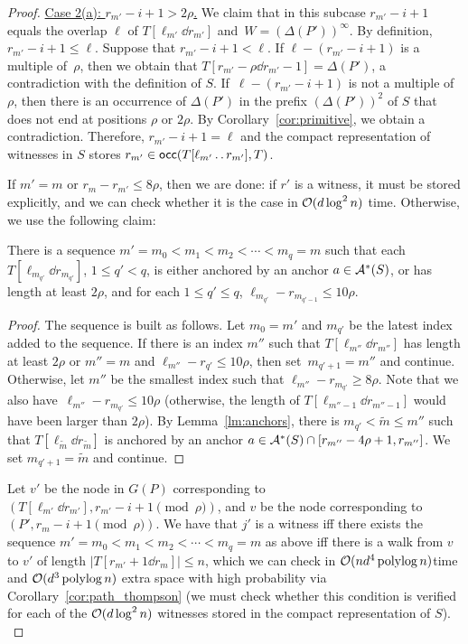 \begin{proof}
\underline{Case 2(a): $r_{m'}-i+1 > 2\rho$.} We claim that in this subcase $r_{m'}-i+1$ equals the overlap $\ell$ of $T[\ell_{m'} \dd r_{m'}]$ and~$W = (\Delta(P'))^\infty$. By definition, $r_{m'}-i+1 \le \ell$. Suppose that $r_{m'}-i+1 < \ell$. If $\ell-(r_{m'}-i+1)$ is a multiple of~$\rho$, then we obtain that $T[r_{m'}-\rho\dd r_{m'}-1] = \Delta(P')$, a contradiction with the definition of $S$. If~$\ell-(r_{m'}-i+1)$ is not a multiple of $\rho$, then there is an occurrence of $\Delta(P')$ in the prefix $(\Delta(P'))^2$ of $S$ that does not end at positions $\rho$ or $2\rho$. By Corollary~\ref{cor:primitive}, we obtain a contradiction. Therefore, $r_{m'}-i+1 = \ell$ and the compact representation of witnesses in $S$ stores $r_{m'} \in \mathsf{occ}(T[\ell_{m'} \mathinner{.\,.\allowbreak} r_{m'}], T)$. 

If $m' = m$ or $r_m-r_{m'} \le 8 \rho$, then we are done: if $r'$ is a witness, it must be stored explicitly, and we can check whether it is the case in $\mathcal{O}(d \log^2n)$ time. Otherwise, we use the following claim:

\begin{claim}\label{claim:subseq}
There is a sequence $m' = m_{0} < m_{1} < m_{2}  < \cdots < m_{q} = m$ such that each $T[\ell_{m_{q'}} \dd r_{m_{q'}}]$, $1 \le q' < q$, is either anchored by an anchor $a \in \mathcal{A}^\ast(S)$, or has length at least $2\rho$, and for each $1 \le q' \le q$, $\ell_{m_{q'}}- r_{m_{q'-1}} \le 10 \rho$. 
\end{claim}
\begin{proof}
The sequence is built as follows. Let $m_{0} = m'$ and $m_{q'}$ be the latest index added to the sequence. If there is an index $m''$ such that $T[\ell_{m''} \dd r_{m''}]$ has length at least $2\rho$ or $m'' = m$ and $\ell_{m''}- r_{q'} \le 10 \rho$, then set~$m_{q'+1} = m''$ and continue. Otherwise, let $m''$ be the smallest index such that $\ell_{m''}- r_{m_{q'}} \ge 8 \rho$. Note that we also have~$\ell_{m''}- r_{m_{q'}} \le 10 \rho$ (otherwise, the length of $T[\ell_{m''-1} \dd r_{m''-1}]$ would have been larger than $2\rho$). By Lemma~\ref{lm:anchors}, there is $m_{q'} < \tilde{m} \le m''$ such that $T[\ell_{\tilde{m}} \dd r_{\tilde{m}}]$ is anchored by an anchor $a \in \mathcal{A}^\ast(S) \cap [r_{m''} - 4 \rho+1, r_{m''}]$. We set $m_{q'+1} = \tilde{m}$ and continue. 
\end{proof}

Let $v'$ be the node in $G(P)$ corresponding to $(T[\ell_{m'} \dd r_{m'}], r_{m'}-i+1 \pmod \rho)$, and $v$ be the node corresponding to $(P', r_m-i+1 \pmod \rho)$. We have that $j'$ is a witness iff there exists the sequence $m' = m_{0} < m_{1} < m_{2}  < \cdots < m_{q} = m$ as above iff there is a walk from $v$ to $v'$ of length $|T[r_{m'}+1 \dd r_{m}]|\leq n$, which we can check in $\mathcal{O}(nd^4 \operatorname{polylog} n)$time and $\mathcal{O}(d^3\operatorname{polylog} n)$ extra space with high probability via Corollary~\ref{cor:path_thompson} (we must check whether this condition is verified for each of the $\mathcal{O}(d \log^2 n)$ witnesses stored in the compact representation of $S$). \label{it:case2a}


\end{proof}
